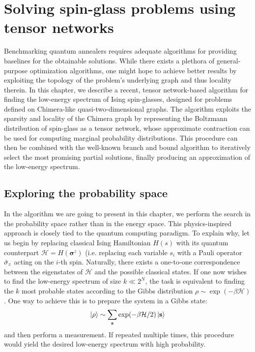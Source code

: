 \chapter{Solving spin-glass problems using tensor networks}

\label{chapter:tn}

Benchmarking quantum annealers requires adequate algorithms for providing
baselines for the obtainable solutions. While there exists a plethora of
general-purpose optimization algorithms, one might hope to achieve better
results by exploiting the topology of the problem's underlying graph and thus
locality therein. In this chapter, we describe a recent, tensor network-based
algorithm \cite{tn} for finding the low-energy spectrum of Ising spin-glasses,
designed for problems defined on Chimera-like quasi-two-dimensional graphs. The
algorithm exploits the sparsity and locality of the Chimera graph by
representing the Boltzmann distribution of spin-glass as a tensor network,
whose approximate contraction can be used for computing marginal probability
distributions. This procedure can then be combined with the well-known branch
and bound algorithm to iteratively select the most promising partial solutions,
finally producing an approximation of the low-energy spectrum.

\section{Exploring the probability space}

In the algorithm we are going to present in this chapter, we perform the search
in the probability space rather than in the energy space. This physics-inspired
approach is closely tied to the quantum computing paradigm. To explain why, let
us begin by replacing classical Ising Hamiltonian $H(s)$ with its quantum
counterpart $\mathcal{H} = H(\boldsymbol{\sigma}^{z})$ (i.e. replacing each
variable $s_{i}$ with a Pauli operator $\hat{\sigma}_{z}$ acting on the $i$-th spin.
Naturally, there exists a one-to-one correspondence between the eigenstates of
$\mathcal{H}$ and the possible classical states. If one now wishes to
find the low-energy spectrum of size $k \ll 2^{N}$, the task is equivalent to
finding the $k$ most probable states according to the Gibbs distribution $\rho
  \sim \exp(-\beta \mathcal{H})$. One way to achieve this is to prepare the
system in a Gibbs state:
\begin{equation}
  \ket{\rho} \sim \sum_{\mathbf{s}} \exp(-\beta \mathcal{H}/2)\ket{\mathbf{s}}
\end{equation}
and then perform a measurement. If repeated multiple times, this procedure
would yield the desired low-energy spectrum with high probability.

